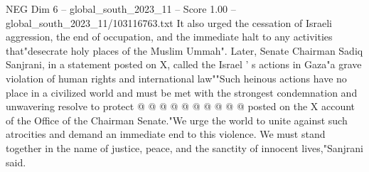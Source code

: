 \begin{textsample}{NEG Dim 6 – global\_south\_2023\_11 – Score 1.00 – global\_south\_2023\_11/103116763.txt}
It also urged the cessation of Israeli aggression, the end of occupation, and the immediate halt to any activities that"desecrate holy places of the Muslim Ummah".
Later, Senate Chairman Sadiq Sanjrani, in a statement posted on X, called the Israel ' s actions in Gaza"a grave violation of human rights and international law""Such heinous actions have no place in a civilized world and must be met with the strongest condemnation and unwavering resolve to protect @ @ @ @ @ @ @ @ @ @ posted on the X account of the Office of the Chairman Senate."We urge the world to unite against such atrocities and demand an immediate end to this violence.
We must stand together in the name of justice, peace, and the sanctity of innocent lives,"Sanjrani said.

\end{textsample}
